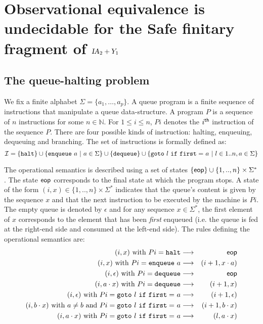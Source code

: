 \documentclass{article}
\newcommand{\nat}{\mathbb{N}}
\newcommand\eop{{\sf eop}}
\newcommand\ialgol{{\textsl{IA}}}
\begin{document}
\section{Observational equivalence is undecidable for the Safe finitary fragment of $\ialgol_2 + Y_1$}

\subsection{The queue-halting problem}
We fix a finite alphabet $\Sigma = \{ a_1, \ldots, a_p \}$. A queue program is a finite sequence of instructions that manipulate a queue data-structure.
A program $P$ is a sequence of $n$ instructions for some $n\in \nat$. For $1 \leq i \leq n$, $P i$ denotes the $i^{\sf th}$ instruction of the sequence $P$. There are four possible kinds of instruction: halting, enqueuing, dequeuing and branching. The set of instructions is formally defined as:
$$ \mathcal{I} = \{ {\tt halt} \} \cup
\{ {\tt enqueue \ } a \ | \ a \in \Sigma \}
\cup \{ {\tt dequeue} \} \cup \{ {\tt goto\ } l {\tt\ if\ first =\ } a \ | \ l \in 1..n, a \in \Sigma \}
 $$


The operational semantics is described using a set of states $ \{ \eop \} \cup \{ 1,..,n \} \times \Sigma^* $. The state $\eop$ corresponds to the final state at which the program stops. A state of the form $(i,x) \in \{ 1,..,n \} \times \Sigma^*$ indicates that the queue's content is given by the sequence $x$ and that the next instruction to be executed by the machine is $P i$. The empty queue is denoted by $\epsilon$ and for any sequence $x \in \Sigma^*$, the first element of $x$ corresponds to the element that has been \emph{first} enqueued (i.e. the queue is fed at the right-end side and consumed at the left-end side). The rules defining the operational semantics are:
\begin{eqnarray*}
(i,x) \mbox{ with } P i = {\tt halt} &\longrightarrow& \eop \\
(i,x) \mbox{ with } P i = {\tt enqueue\ } a &\longrightarrow& (i+1,x \cdot a) \\
(i,\epsilon) \mbox{ with } P i = {\tt dequeue } &\longrightarrow& \eop \\
(i,a \cdot x) \mbox{ with } P i = {\tt dequeue } &\longrightarrow& (i+1,x) \\
(i,\epsilon) \mbox{ with } P i =  {\tt goto\ } l {\tt\ if\ first =\ } a &\longrightarrow& (i+1,\epsilon) \\
(i,b \cdot x) \mbox{ with } a \neq b \mbox{ and } P i =  {\tt goto\ } l {\tt\ if\ first =\ } a &\longrightarrow& (i+1,b \cdot x) \\
(i,a \cdot x) \mbox{ with } P i =  {\tt goto\ } l {\tt\ if\ first =\ } a &\longrightarrow& (l,a \cdot x)
\end{eqnarray*}
\end{document}
